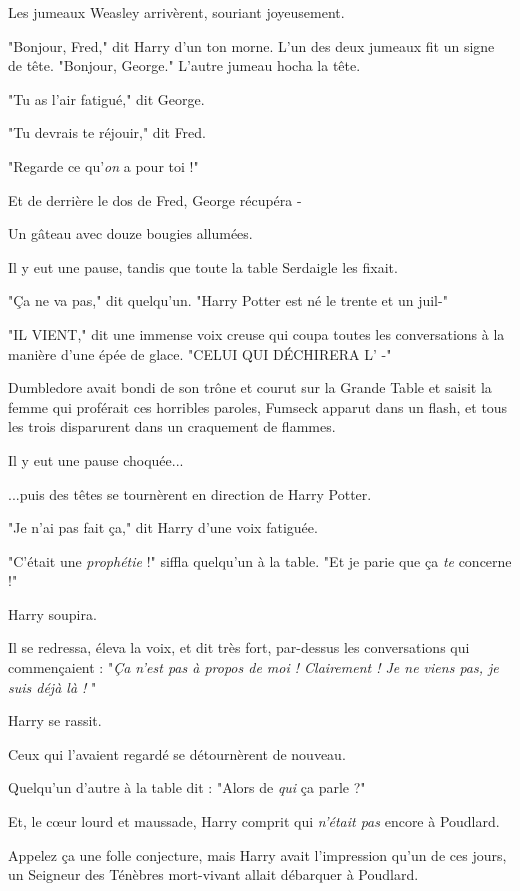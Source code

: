 Les jumeaux Weasley arrivèrent, souriant joyeusement.

"Bonjour, Fred," dit Harry d'un ton morne. L'un des deux jumeaux fit un signe de tête. "Bonjour, George." L'autre jumeau hocha la tête.

"Tu as l'air fatigué," dit George.

"Tu devrais te réjouir," dit Fred.

"Regarde ce qu'\emph{on}  a pour toi !"

Et de derrière le dos de Fred, George récupéra -

Un gâteau avec douze bougies allumées.

Il y eut une pause, tandis que toute la table Serdaigle les fixait.

"Ça ne va pas," dit quelqu'un. "Harry Potter est né le trente et un juil-"

"IL VIENT," dit une immense voix creuse qui coupa toutes les conversations à la manière d'une épée de glace. "CELUI QUI DÉCHIRERA L' -"

Dumbledore avait bondi de son trône et courut sur la Grande Table et saisit la femme qui proférait ces horribles paroles, Fumseck apparut dans un flash, et tous les trois disparurent dans un craquement de flammes.

Il y eut une pause choquée...

...puis des têtes se tournèrent en direction de Harry Potter.

"Je n'ai pas fait ça," dit Harry d'une voix fatiguée.

"C'était une \emph{prophétie}  !" siffla quelqu'un à la table. "Et je parie que ça \emph{te}  concerne !"

Harry soupira.

Il se redressa, éleva la voix, et dit très fort, par-dessus les conversations qui commençaient : "\emph{Ça n'est pas à propos de moi ! Clairement ! Je ne viens pas, je suis déjà là !} "

Harry se rassit.

Ceux qui l'avaient regardé se détournèrent de nouveau.

Quelqu'un d'autre à la table dit : "Alors de \emph{qui}  ça parle ?"

Et, le cœur lourd et maussade, Harry comprit qui \emph{n'était pas}  encore à Poudlard.

Appelez ça une folle conjecture, mais Harry avait l'impression qu'un de ces jours, un Seigneur des Ténèbres mort-vivant allait débarquer à Poudlard.


